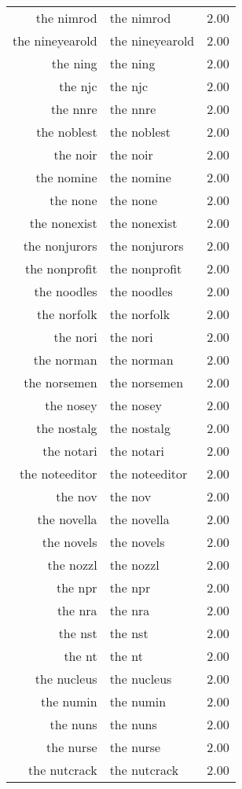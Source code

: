 \begin{table}[ht]
\begin{tabular}{rlr}
  the nimrod & the nimrod & 2.00 \\ 
  the nineyearold & the nineyearold & 2.00 \\ 
  the ning & the ning & 2.00 \\ 
  the njc & the njc & 2.00 \\ 
  the nnre & the nnre & 2.00 \\ 
  the noblest & the noblest & 2.00 \\ 
  the noir & the noir & 2.00 \\ 
  the nomine & the nomine & 2.00 \\ 
  the none & the none & 2.00 \\ 
  the nonexist & the nonexist & 2.00 \\ 
  the nonjurors & the nonjurors & 2.00 \\ 
  the nonprofit & the nonprofit & 2.00 \\ 
  the noodles & the noodles & 2.00 \\ 
  the norfolk & the norfolk & 2.00 \\ 
  the nori & the nori & 2.00 \\ 
  the norman & the norman & 2.00 \\ 
  the norsemen & the norsemen & 2.00 \\ 
  the nosey & the nosey & 2.00 \\ 
  the nostalg & the nostalg & 2.00 \\ 
  the notari & the notari & 2.00 \\ 
  the noteeditor & the noteeditor & 2.00 \\ 
  the nov & the nov & 2.00 \\ 
  the novella & the novella & 2.00 \\ 
  the novels & the novels & 2.00 \\ 
  the nozzl & the nozzl & 2.00 \\ 
  the npr & the npr & 2.00 \\ 
  the nra & the nra & 2.00 \\ 
  the nst & the nst & 2.00 \\ 
  the nt & the nt & 2.00 \\ 
  the nucleus & the nucleus & 2.00 \\ 
  the numin & the numin & 2.00 \\ 
  the nuns & the nuns & 2.00 \\ 
  the nurse & the nurse & 2.00 \\ 
  the nutcrack & the nutcrack & 2.00 \\ 

\end{tabular}
\end{table}
